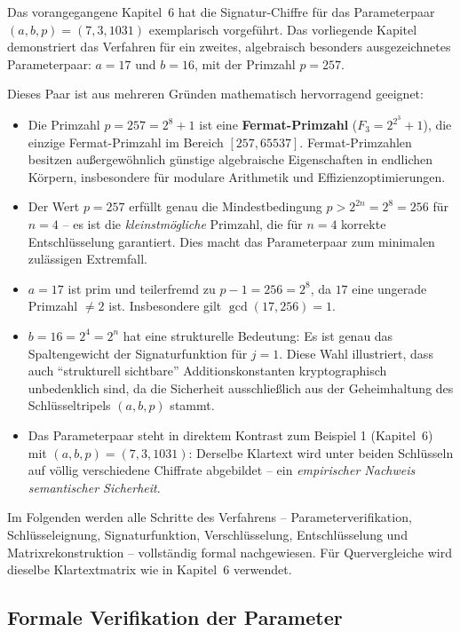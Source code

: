 ﻿\documentclass[a4paper,12pt]{scrreprt}
\theoremstyle{definition}
\begin{document}
Das vorangegangene Kapitel~6 hat die Signatur-Chiffre für das Parameterpaar $(a, b, p) = (7, 3, 1031)$ exemplarisch vorgeführt. Das vorliegende Kapitel demonstriert das Verfahren für ein zweites, algebraisch besonders ausgezeichnetes Parameterpaar: $a = 17$ und $b = 16$, mit der Primzahl $p = 257$.

Dieses Paar ist aus mehreren Gründen mathematisch hervorragend geeignet:

\begin{itemize}
  \item Die Primzahl $p = 257 = 2^8 + 1$ ist eine \textbf{Fermat-Primzahl} ($F_3 = 2^{2^3} + 1$), die einzige Fermat-Primzahl im Bereich $[257, 65537]$. Fermat-Primzahlen besitzen außergewöhnlich günstige algebraische Eigenschaften in endlichen Körpern, insbesondere für modulare Arithmetik und Effizienzoptimierungen.
  \item Der Wert $p = 257$ erfüllt genau die Mindestbedingung $p > 2^{2n} = 2^8 = 256$ für $n = 4$ -- es ist die \emph{kleinstmögliche} Primzahl, die für $n = 4$ korrekte Entschlüsselung garantiert. Dies macht das Parameterpaar zum minimalen zulässigen Extremfall.
  \item $a = 17$ ist prim und teilerfremd zu $p - 1 = 256 = 2^8$, da $17$ eine ungerade Primzahl $\neq 2$ ist. Insbesondere gilt $\gcd(17, 256) = 1$.
  \item $b = 16 = 2^4 = 2^n$ hat eine strukturelle Bedeutung: Es ist genau das Spaltengewicht der Signaturfunktion für $j = 1$. Diese Wahl illustriert, dass auch ``strukturell sichtbare'' Additionskonstanten kryptographisch unbedenklich sind, da die Sicherheit ausschließlich aus der Geheimhaltung des Schlüsseltripels $(a, b, p)$ stammt.
  \item Das Parameterpaar steht in direktem Kontrast zum Beispiel 1 (Kapitel~6) mit $(a, b, p) = (7, 3, 1031)$: Derselbe Klartext wird unter beiden Schlüsseln auf völlig verschiedene Chiffrate abgebildet -- ein \emph{empirischer Nachweis semantischer Sicherheit}.
\end{itemize}

Im Folgenden werden alle Schritte des Verfahrens -- Parameterverifikation, Schlüsseleignung, Signaturfunktion, Verschlüsselung, Entschlüsselung und Matrixrekonstruktion -- vollständig formal nachgewiesen. Für Quervergleiche wird dieselbe Klartextmatrix wie in Kapitel~6 verwendet.

\subsection{Formale Verifikation der Parameter}
\end{document}
